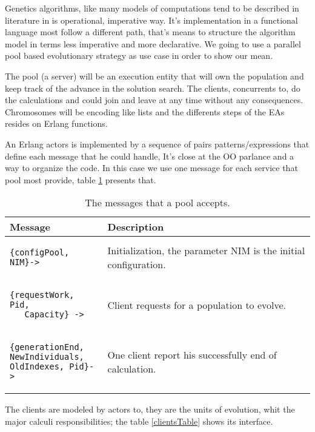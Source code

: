 \documentclass{acm_proc_article-sp}
\begin{document}
Genetics algorithms, like many models of computations tend to be described in literature in is operational, imperative way. It's implementation in a functional language most follow a different path, that's means to structure the algorithm model in terms less imperative and more declarative. We going to use a parallel pool based evolutionary strategy\cite{DBLP:conf/3pgcic/GuervosMFEL12} as use case in order to show our mean.

The pool (a server) will be an execution entity that will own the population and keep track of the advance in the solution search. The clients, concurrents to, do the calculations and could join and leave at any time without any consequences. Chromosomes will be encoding like lists and the differents steps of the EAs resides on Erlang functions.

An Erlang actors is implemented by a sequence of pairs patterns/expressions that define each message that he could handle, It's close at the OO parlance and a way to organize the code. In this case we use one message for each service that pool most provide, table \ref{poolTable} presents that.

\begin{table}
  \centering
   \begin{tabular}{|p{3cm}|p{4cm}|}
   \hline
   \textbf{Message} & \textbf{Description}\\
     \hline
\begin{verbatim}
{configPool, NIM}->
\end{verbatim}& Initialization, the parameter NIM is the initial configuration. \\
\hline
\begin{verbatim}
{requestWork, Pid,
   Capacity} ->
\end{verbatim} & Client requests for a population to evolve.\\
\hline
\begin{verbatim}
{generationEnd,
NewIndividuals,
OldIndexes, Pid}->
\end{verbatim} & One client report his successfully end of calculation. \\
\hline
   \end{tabular}
  \caption{The messages that a pool accepts.}\label{poolTable}
\end{table}

The clients are modeled by actors to, they are the units of evolution, whit the major calculi responsibilities; the table \ref{clientsTable} shows its interface.
\end{document}
